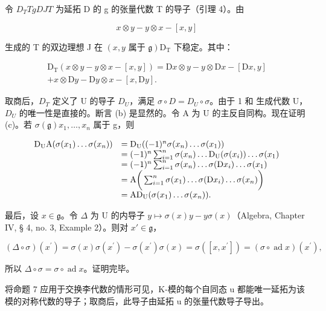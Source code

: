 令 \(D_T\)\(T\)\(g\)\(D\)\(J\)\(T\) 为延拓 D 的 g 的张量代数 T 的导子（引理 4）。由

\[
x \otimes y - y \otimes x - [ x, y ]
\]

生成的 T 的双边理想 J 在 \((x,y \text{ 属于 } \mathfrak{g})\)\(\mathrm{D}_{\mathrm{T}}\) 下稳定。其中：

\[
\begin{array}{r} \mathrm{D} _ {\mathrm{T}} (x \otimes y - y \otimes x - [ x, y ]) = \mathrm{D} x \otimes y - y \otimes \mathrm{D} x - [ \mathrm{D} x, y ] \\ + x \otimes \mathrm{D} y - \mathrm{D} y \otimes x - [ x, \mathrm{D} y ]. \end{array}
\]

取商后，\(D_{T}\) 定义了 U 的导子 \(D_{U}\)，满足 \(\sigma \circ D = D_{U} \circ \sigma\)。由于 1 和  生成代数 U，\(D_{U}\) 的唯一性是直接的。断言 (b) 是显然的。令 A 为 U 的主反自同构。现在证明 (c)。若 \(\sigma(\mathfrak{g})\)\(x_{1}, \ldots, x_{n}\) 属于 g，则

\[
\begin{array}{r l} \mathrm{D} _ {\mathrm{U}} \mathrm{A} (\sigma (x _ {1}) \dots \sigma (x _ {n})) & = \mathrm{D} _ {\mathrm{U}} ((- 1) ^ {n} \sigma (x _ {n}) \dots \sigma (x _ {1})) \\ & = (- 1) ^ {n} \sum_ {i = 1} ^ {n} \sigma (x _ {n}) \dots \mathrm{D} _ {\mathrm{U}} (\sigma (x _ {i})) \dots \sigma (x _ {1}) \\ & = (- 1) ^ {n} \sum_ {i = 1} ^ {n} \sigma (x _ {n}) \dots \sigma (\mathrm{D} x _ {i}) \dots \sigma (x _ {1}) \\ & = \mathrm{A} \bigg (\sum_ {i = 1} ^ {n} \sigma (x _ {1}) \dots \sigma (\mathrm{D} x _ {i}) \dots \sigma (x _ {n}) \bigg) \\ & = \mathrm{AD} _ {\mathrm{U}} (\sigma (x _ {1}) \dots \sigma (x _ {n})). \end{array}
\]

最后，设 \(x \in \mathfrak{g}\)。令 \(\Delta\) 为 U 的内导子 \(y \mapsto \sigma(x)y - y\sigma(x)\)（Algebra, Chapter IV, § 4, no. 3, Example 2）。则对 \(x' \in \mathfrak{g}\)，

\[
(\Delta \circ \sigma) (x ^ {\prime}) = \sigma (x) \sigma (x ^ {\prime}) - \sigma (x ^ {\prime}) \sigma (x) = \sigma ([ x, x ^ {\prime} ]) = (\sigma \circ \operatorname{ad} x) (x ^ {\prime}),
\]

所以 \(\Delta \circ \sigma = \sigma \circ \operatorname{ad} x\)。证明完毕。

将命题 7 应用于交换李代数的情形可见，K-模的每个自同态 u 都能唯一延拓为该模的对称代数的导子；取商后，此导子由延拓 u 的张量代数导子导出。

